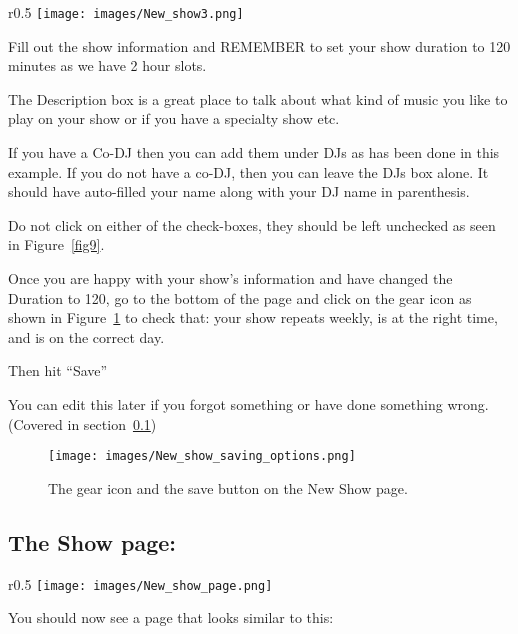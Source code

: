 \documentclass[12pt]{article}
\begin{document}
\clearpage

\begin{wrapfigure}{r}{0.5\textwidth}
    \texttt{[image: images/New\_show3.png]}
    \caption{The duration has been changed to 120 and a Co-DJ has been added.}
    \label{fig9}
\end{wrapfigure}


Fill out the show information and REMEMBER to set your show duration to 120 minutes as we have 2 hour slots.

The Description box is a great place to talk about what kind of music you like to play on your show or if you have a specialty show etc. 

If you have a Co-DJ then you can add them under DJs as has been done in this example. If you do not have a co-DJ, then you can leave the DJs box alone. It should have auto-filled your name along with your DJ name in parenthesis.

Do not click on either of the check-boxes, they should be left unchecked as seen in Figure~\ref{fig9}.

Once you are happy with your show's information and have changed the Duration to 120, go to the bottom of the page and click on the gear icon as shown in Figure~\ref{fig10} 
to check that: your show repeats weekly, is at the right time, and is on the correct day. 

Then hit ``Save''

You can edit this later if you forgot something or have done something wrong.
(Covered in section~\ref{show_page})

\begin{figure}[h]
    \centering
    \texttt{[image: images/New\_show\_saving\_options.png]}
    \caption{The gear icon and the save button on the New Show page.}
    \label{fig10}
\end{figure}

\subsection{The Show page:} \label{show_page}

\begin{wrapfigure}{r}{0.5\textwidth}
    \texttt{[image: images/New\_show\_page.png]}
    \caption{The Show page.}
    \label{fig11}
\end{wrapfigure}

You should now see a page that looks similar to this: 
\end{document}
